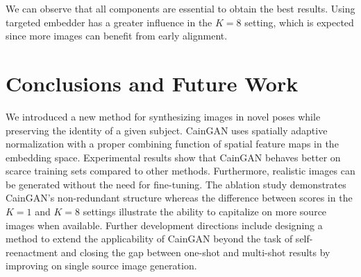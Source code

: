 \documentclass[11pt,a4paper]{article}
\begin{document}
We can observe that all components are essential to obtain the best results. Using targeted embedder has a greater influence in the $K=8$ setting, which is expected since more images can benefit from early alignment.

\section{Conclusions and Future Work}
\label{sec:conclusion}
We introduced a new method for synthesizing images in novel poses while preserving the identity of a given subject. CainGAN  uses spatially adaptive normalization with a proper combining function of spatial feature maps in the embedding space. Experimental results show that CainGAN behaves better on scarce training sets compared to other methods. Furthermore, realistic images can be generated without the need for fine-tuning. The ablation study demonstrates CainGAN's non-redundant structure whereas the difference between scores in the $K=1$ and $K=8$ settings illustrate the ability to capitalize on more source images when available.
Further development directions include designing a method to extend the applicability of CainGAN beyond the task of self-reenactment and closing the gap between one-shot and multi-shot results by improving on single source image generation.
\end{document}
